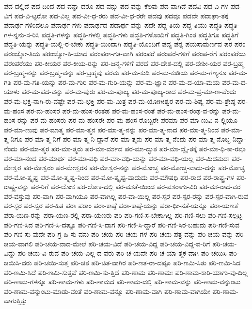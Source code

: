 {ಪದ-ದಲ್ಲಿದೆ
ಪದ-ದಿಂದ
ಪದ-ವನ್ನಾ-ದರೂ
ಪದ-ವನ್ನು
ಪದ-ವನ್ನು-ಕೆಲವು
ಪದ-ವಾಗಿದೆ
ಪದವಿ
ಪದ-ವಿ-ಗಳ
ಪದ-ವಿಗೆ
ಪದ-ವಿ-ಟ್ಟರೋ
ಪದ-ವಿಲ್ಲ
ಪದ-ವೀ-ಧ-ರರು
ಪದ-ವೀ-ಧ-ರರೇ
ಪದವು
ಪದವೂ
ಪದವೇ
ಪದಾಘಾ-ತಕ್ಕೆ
ಪದಾರ್ಥ-ಗಳಿಂದಲೂ
ಪದಾರ್ಥ-ಗಳು
ಪದಾರ್ಥದ
ಪದಾರ್ಥ-ವನ್ನು
ಪದೇ
ಪದ್ದ-ತಿಯ
ಪದ್ದ-ತಿಯು
ಪದ್ಧತಿ
ಪದ್ಧತಿ-ಗಳ-ನ್ನನು-ಸ-ರಿಸಿ
ಪದ್ಧತಿ-ಗಳನ್ನು
ಪದ್ಧತಿ-ಗಳಲ್ಲಿ
ಪದ್ಧತಿ-ಗಳು
ಪದ್ಧತಿ-ಗಳೊಂದಿಗೆ
ಪದ್ಧತಿ-ಗಿಂತ
ಪದ್ಧತಿಗೂ
ಪದ್ಧತಿಗೆ
ಪದ್ಧತಿ-ಯನ್ನು
ಪದ್ಧತಿ-ಯಲ್ಲಿ-ರ-ಬೇಕು
ಪದ್ಧತಿ-ಯಿಂದಾಗಿ
ಪದ್ಧತಿ-ಯೊಂದಿಗೆ
ಪದ್ಯ
ಪನ್ನ
ಪಯಸಾಮರ್ಣವ
ಪರ
ಪರಂ
ಪರಂಜ್ಯೋ-ತಿಯ
ಪರಂಜ್ಯೋ-ತಿ-ಯಾದ
ಪರಂಪರಾ-ಗತ-ವಾಗಿ
ಪರಂಪರೆ
ಪರಂಪರೆ-ಗಳಿಗೆ
ಪರಂಪ-ರೆಗೆ
ಪರಂಪರೆಯ
ಪರಂಪರೆಯು
ಪರ-ಕೀಯರ
ಪರ-ಕೀಯ-ರನ್ನು
ಪರ-ಜನ್ಮ-ಗಳಿಗೆ
ಪರದೆ
ಪರ-ದೇಶ-ದಲ್ಲಿ
ಪರ-ದೇಶೀ-ಯರ
ಪರ-ಬ್ರಹ್ಮ
ಪರ-ಬ್ರಹ್ಮ-ನನ್ನು
ಪರ-ಬ್ರಹ್ಮ-ವನ್ನು
ಪರ-ಬ್ರಹ್ಮವು
ಪರಮ
ಪರ-ಮ-ಕುಡಿ
ಪರ-ಮ-ಕುಡಿಯ
ಪರ-ಮ-ಗಣ್ಯನೂ
ಪರ-ಮ-ಗತಿ
ಪರ-ಮ-ಗತಿ-ಯನ್ನು
ಪರ-ಮ-ಗುರಿ
ಪರ-ಮ-ಗುರಿ-ಯನ್ನು
ಪರ-ಮ-ಜ್ಞಾನ
ಪರ-ಮ-ದ-ಯಾ-ಮಯ
ಪರ-ಮ-ದ-ಯಾಳು
ಪರ-ಮ-ಪದ-ವನ್ನು
ಪರ-ಮ-ಪುರು
ಪರ-ಮ-ಪೂಜ್ಯ
ಪರ-ಮ-ಪೂಜ್ಯ-ರಾದ
ಪರ-ಮ-ಪ್ರ-ಮಾ-ಣ-ವೆಂದು
ಪರ-ಮ-ಭಕ್ತ-ನಾಗಿ-ರು-ವಷ್ಟೇ
ಪರ-ಮ-ಭಕ್ತಿ
ಪರ-ಮ-ಮಿತ್ರ
ಪರ-ಮ-ಯೋಗೀಶ್ವರ
ಪರ-ಮ-ಶಿಷ್ಯ
ಪರ-ಮ-ಶ್ರೇಷ್ಠ
ಪರ-ಮ-ಹಂಸ
ಪರ-ಮ-ಹಂಸರ
ಪರ-ಮ-ಹಂಸ-ರಂತಹ
ಪರ-ಮ-ಹಂಸ-ರಂತೆ
ಪರ-ಮ-ಹಂಸ-ರಂಥ-ವ-ರನ್ನು
ಪರ-ಮ-ಹಂಸ-ರನ್ನು
ಪರ-ಮ-ಹಂಸರು
ಪರ-ಮ-ಹಂಸರೇ
ಪರ-ಮ-ಹಂಸ-ರೊಬ್ಬರೇ
ಪರಮಾ
ಪರ-ಮಾ-ಣುವಿ-ನ-ಲ್ಲಿಯೂ
ಪರ-ಮಾ-ಣುವು
ಪರ-ಮಾತ್ಮ
ಪರ-ಮಾ-ತ್ಮನ
ಪರ-ಮಾ-ತ್ಮ-ನನ್ನು
ಪರ-ಮಾ-ತ್ಮ-ನಾದ
ಪರ-ಮಾ-ತ್ಮ-ನಿಂದ
ಪರ-ಮಾ-ತ್ಮ-ನಿಗೂ
ಪರ-ಮಾ-ತ್ಮ-ನಿಗೆ
ಪರ-ಮಾ-ತ್ಮ-ನಿ-ದ್ದಾನೆ
ಪರ-ಮಾ-ತ್ಮನು
ಪರ-ಮಾ-ತ್ಮ-ನೆಂದು
ಪರ-ಮಾ-ತ್ಮ-ನೊಬ್ಬ-ನಿದ್ದಾ-ನೆಂದು
ಪರ-ಮಾ-ತ್ಮರ
ಪರ-ಮಾ-ತ್ಮರು
ಪರ-ಮಾ-ದರ್ಶದ
ಪರ-ಮಾ-ದ್ಭುತ
ಪರ-ಮಾ-ದ್ವೈ-ತಕ್ಕೆ
ಪರ-ಮಾ-ಧಿ-ಕಾ-ರವೂ
ಪರ-ಮಾ-ನಂದ
ಪರ-ಮಾರ್ಥ
ಪರ-ಮಾ-ವಧಿ
ಪರ-ಮಾ-ವಧಿ-ಯನ್ನು
ಪರ-ಮಾ-ವಧಿ-ಯಲ್ಲ
ಪರ-ಮಿದಮದಃ
ಪರ-ಮೇಶ್ವರ
ಪರ-ಮೇಶ್ವರಂ
ಪರ-ಮೇಶ್ವರನ
ಪರ-ಮೇಶ್ವರ-ನನ್ನು
ಪರ-ಮೋಚ್ಚ
ಪರ-ಮೋಚ್ಚ-ವಾದು-ದನ್ನು
ಪರ-ಮೋಚ್ಛ
ಪರ-ಮೋ-ತ್ಕೃಷ್ಟ
ಪರ-ಮೋ-ತ್ಕೃಷ್ಟ-ನಿಂದ
ಪರ-ಮೋ-ತ್ಕೃಷ್ಟ-ವಾದುದು
ಪರ-ಮೌಷಧಿ
ಪರ-ರಾದ
ಪರ-ರಾಷ್ಟ್ರ-ಗಳ
ಪರ-ರಾಷ್ಟ್ರ-ವನ್ನು
ಪರ-ರಿಗೆ
ಪರ-ಲೋಕ
ಪರ-ಲೋಕ-ದಲ್ಲಿ
ಪರ-ವಶತೆ-ಯಿಂದ
ಪರ-ವಶರಾಗು-ವಿರಿ
ಪರ-ವಶ-ರಾದ-ವರ
ಪರ-ವಸ್ತುವು
ಪರ-ವಾಗಿ
ಪರ-ವಾಗಿಯೂ
ಪರ-ವಾಗಿಲ್ಲ
ಪರ-ವಾ-ಯಿಲ್ಲ
ಪರ-ಸ್ಪರ
ಪರ-ಸ್ಪರ-ರನ್ನು
ಪರ-ಸ್ಪರ-ವಾಗಿ-ರುವ
ಪರ-ಸ್ಫರ
ಪರ-ಸ್ವರ
ಪರ-ಹಿತ
ಪರಾ
ಪರಾಂ
ಪರಾ-ಕಾಷ್ಠೆ
ಪರಾ-ಕಾಷ್ಠೆ-ಯನ್ನು
ಪರಾ-ಧೀ-ನತೆ-ಯನ್ನೂ
ಪರಾ-ಯಣತೆ
ಪರಾ-ಯಣ-ರನ್ನು
ಪರಾ-ಯಣ-ರಲ್ಲಿ
ಪರಾ-ಯಣರು
ಪರಿ
ಪರಿ-ಗಣಿ-ಸ-ಬೇಕಾಗಿಲ್ಲ
ಪರಿ-ಗಣಿ-ಸಲು
ಪರಿ-ಗಣಿ-ಸಲ್ಪಟ್ಟ
ಪರಿ-ಗಣಿ-ಸಿದ
ಪರಿ-ಗಣಿ-ಸಿ-ದಷ್ಟೂ
ಪರಿ-ಗಣಿ-ಸಿ-ದಾಗ
ಪರಿ-ಗಣಿ-ಸಿ-ದ್ದಾರೆ
ಪರಿ-ಗಣಿ-ಸಿರ-ಬಹುದು
ಪರಿ-ಗಣಿ-ಸುವ
ಪರಿ-ಗಣಿ-ಸು-ವುದೇ
ಪರಿ-ಗ್ರ-ಹಿ-ಸು-ವನು
ಪರಿ-ಚಯ
ಪರಿ-ಚಯ-ಗಳ
ಪರಿ-ಚಯ-ಪತ್ರ-ವನ್ನು
ಪರಿ-ಚಯ-ವನ್ನು
ಪರಿ-ಚಯ-ವಾಗಲಿ
ಪರಿ-ಚಯ-ವಾದ-ಮೇಲೆ
ಪರಿ-ಚಯ-ವಿದೆ
ಪರಿ-ಚಯ-ವಿದ್ದ
ಪರಿ-ಚಯ-ವಿದ್ದ-ವ-ರಿಗೆ
ಪರಿ-ಚಯ-ವಿದ್ದು
ಪರಿ-ಚಯ-ವಿ-ರುವ
ಪರಿ-ಚಯ-ವಿಲ್ಲ-ದ-ವರು
ಪರಿ-ಚ-ಯವೇ
ಪರಿ-ಚ-ಯಾ-ತ್ಮಕ-ವಾಗಿ
ಪರಿ-ಚಯಿಸಿ
ಪರಿ-ಚಯಿಸಿ-ದರು
ಪರಿ-ಚಯಿ-ಸುತ್ತ
ಪರಿ-ಚಿತ
ಪರಿ-ಚಿತ-ವಾಗಿರ
ಪರಿ-ಣತ-ರಾ-ದಷ್ಟೂ
ಪರಿ-ಣಮಿ-ಸಿತು
ಪರಿ-ಣಮಿ-ಸಿದ
ಪರಿ-ಣಮಿ-ಸಿದೆ
ಪರಿ-ಣಮಿ-ಸುತ್ತವೆ
ಪರಿ-ಣಮಿ-ಸು-ತ್ತಿದೆ
ಪರಿ-ಣಾಮ
ಪರಿ-ಣಾಮಃ
ಪರಿ-ಣಾಮ-ಕಾರಿ-ಯಾಗು-ವು-ದಿಲ್ಲ
ಪರಿ-ಣಾಮ-ಗಳನ್ನೂ
ಪರಿ-ಣಾಮ-ಗಳು
ಪರಿ-ಣಾಮದ
ಪರಿ-ಣಾಮ-ದಲ್ಲಿ
ಪರಿ-ಣಾಮ-ವನ್ನು
ಪರಿ-ಣಾಮ-ವನ್ನುಂಟು
ಪರಿ-ಣಾಮ-ವನ್ನುಂಟು-ಮಾಡು-ವಂತೆ
ಪರಿ-ಣಾಮ-ವನ್ನೂ
ಪರಿ-ಣಾಮ-ವಾಗಿ
ಪರಿ-ಣಾಮ-ವಾಗಿಯೇ
ಪರಿ-ಣಾಮ-ವಾಗುತ್ತಿತ್ತು
}
